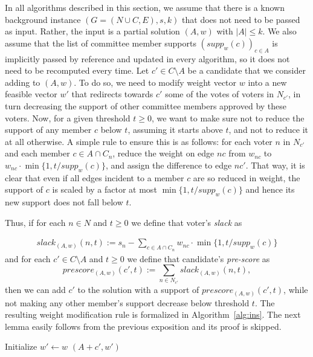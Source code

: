 In all algorithms described in this section, we assume that there is a known background instance $(G=(N\cup C, E), s, k)$ that does not need to be passed as input. Rather, the input is a partial solution $(A,w)$ with $|A|\leq k$. We also assume that the list of committee member supports $(supp_w(c))_{c\in A}$ is implicitly passed by reference and updated in every algorithm, so it does not need to be recomputed every time.
%
Let $c'\in C\setminus A$ be a candidate that we consider adding to $(A,w)$. To do so, we need to modify weight vector $w$ into a new feasible vector $w'$ that redirects towards $c'$ some of the votes of voters in $N_{c'}$, in turn decreasing the support of other committee members approved by these voters. Now, for a given threshold $t\geq 0$, we want to make sure not to reduce the support of any member $c$ below $t$, assuming it starts above $t$, and not to reduce it at all otherwise. A simple rule to ensure this is as follows: for each voter $n$ in $N_{c'}$ and each member $c\in A\cap C_n$, reduce the weight on edge $nc$ from $w_{nc}$ to $w_{nc}\cdot \min\{1, t/supp_w(c)\}$, and assign the difference to edge $nc'$. That way, it is clear that even if all edges incident to a member $c$ are so reduced in weight, the support of $c$ is scaled by a factor at most $\min\{1, t/supp_w(c)\}$ and hence its new support does not fall below $t$.

Thus, if for each $n\in N$ and $t\geq 0$ we define that voter's \emph{slack} as

\begin{align}
    slack_{(A,w)}(n,t):= s_n - \sum_{c\in A\cap C_n} w_{nc} \cdot\min \Big\{ 1, t/supp_w(c)\Big\} \label{eq:slack}
\end{align}
%
and for each $c'\in C\setminus A$ and $t\geq 0$ we define that candidate's \emph{pre-score} as
%
\begin{equation}\label{eq:prescore}
    prescore_{(A,w)}(c',t) := \sum_{n\in N_{c'}} slack_{(A,w)}(n,t),
\end{equation}
%
then we can add $c'$ to the solution with a support of $prescore_{(A,w)}(c',t)$, while not making any other member's support decrease below threshold $t$. The resulting weight modification rule is formalized in Algorithm~\ref{alg:ins}. The next lemma easily follows from the previous exposition and its proof is skipped.

\begin{algorithm}[htb]\label{alg:ins}
\SetAlgoLined
{}
Initialize $w'\leftarrow w$\;
\Return $(A+c',w')$\;
 \caption{$\ins(A,w,c',t)$}
\end{algorithm}

